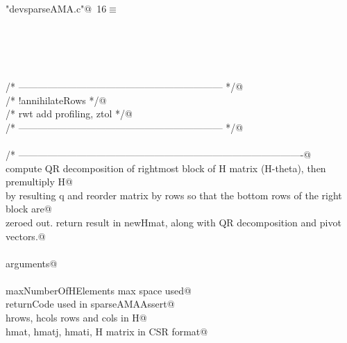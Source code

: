 \documentclass[12pt]{article}
\begin{document}
\begin{flushleft} \small
\begin{minipage}{\linewidth}\label{scrap3}\raggedright\small
{} \verb@"devsparseAMA.c"@\nobreak\ {\footnotesize {16}}$\equiv$
\vspace{-1ex}
\begin{list}{}{} \item
\mbox{}\verb@@\\
\mbox{}\verb@@\\
\mbox{}\verb@@\\
\mbox{}\verb@@\\
\mbox{}\verb@/* --------------------------------------------------------------- */@\\
\mbox{}\verb@/* !annihilateRows                                                 */@\\
\mbox{}\verb@/* rwt add profiling, ztol                                         */@\\
\mbox{}\verb@/* --------------------------------------------------------------- */@\\
\mbox{}\verb@@\\
\mbox{}\verb@/* ----------------------------------------------------------------------------------------@\\
\mbox{}\verb@    compute QR decomposition of rightmost block of H matrix (H-theta), then premultiply H@\\
\mbox{}\verb@    by resulting q and reorder matrix by rows so that the bottom rows of the right block are@\\
\mbox{}\verb@    zeroed out.  return result in newHmat, along with QR decomposition and pivot vectors.@\\
\mbox{}\verb@@\\
\mbox{}\verb@        arguments@\\
\mbox{}\verb@@\\
\mbox{}\verb@                maxNumberOfHElements                                            max space used@\\
\mbox{}\verb@            returnCode                                                                  used in sparseAMAAssert@\\
\mbox{}\verb@            hrows, hcols                                                                rows and cols in H@\\
\mbox{}\verb@            hmat, hmatj, hmati,                                                 H matrix in CSR format@\\

\end{list}
\end{minipage}
\end{flushleft}
\end{document}
